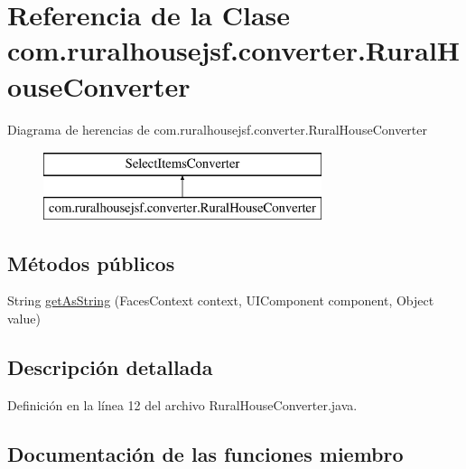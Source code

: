 \hypertarget{classcom_1_1ruralhousejsf_1_1converter_1_1_rural_house_converter}{}\section{Referencia de la Clase com.\+ruralhousejsf.\+converter.\+Rural\+House\+Converter}
\label{classcom_1_1ruralhousejsf_1_1converter_1_1_rural_house_converter}
Diagrama de herencias de com.\+ruralhousejsf.\+converter.\+Rural\+House\+Converter\begin{figure}[H]
\begin{center}
\leavevmode
\includegraphics[height=2.000000cm]{classcom_1_1ruralhousejsf_1_1converter_1_1_rural_house_converter}
\end{center}
\end{figure}
\subsection*{Métodos públicos}
\begin{DoxyCompactItemize}
\item 
String \mbox{\hyperlink{classcom_1_1ruralhousejsf_1_1converter_1_1_rural_house_converter_af5817e782563287dd8f10081cc24215d}{get\+As\+String}} (Faces\+Context context, U\+I\+Component component, Object value)
\end{DoxyCompactItemize}


\subsection{Descripción detallada}


Definición en la línea 12 del archivo Rural\+House\+Converter.\+java.



\subsection{Documentación de las funciones miembro}
\mbox{\label{classcom_1_1ruralhousejsf_1_1converter_1_1_rural_house_converter_af5817e782563287dd8f10081cc24215d}} 
